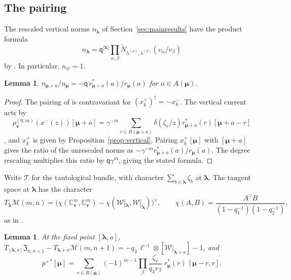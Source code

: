 \documentclass[11pt]{amsart}
\newtheorem{lemma}[theorem]{Lemma}
\theoremstyle{definition}
\theoremstyle{remark}
\newcommand{\Mq}{\mathsf q}                      %
\newcommand{\bv}{{\mathbf v}}                    %
\newcommand{\bl}{{\boldsymbol{\lambda}}}         %
\newcommand{\bmu}{{\boldsymbol{\mu}}}
\newcommand{\Add}[1]{A(#1)}                      %
\newcommand{\Rem}[1]{R(#1)}                      %
\newcommand{\bwt}[1]{\zeta_{#1}}                 %
\newcommand{\res}[2]{r_{#1}(#2)}                 %
\newcommand{\cores}[2]{r^*_{#1}(#2)}             %
\newcommand{\srcnorm}[1]{n_{#1}}                 %
\newcommand{\framing}{\mathbb C^m_{\bv}}         %
\newcommand{\Gies}[2]{\mathcal M(#1,#2)}         %
\newcommand{\Zc}{\mathfrak Z}
\newcommand{\Hecke}[1]{\Zc_{#1,#1+1}}            %
\newcommand{\Wc}{\mathcal W}                     %
\newcommand{\Tc}{\mathcal T}                     %
\newcommand{\fix}[1]{[#1]}                       %
\newcommand{\pt}[2]{[#1,#2]}                     %
\newcommand{\pplus}{p^+}                         %
\newcommand{\taut}{\ell}                         %
\newcommand{\xplus}[1]{x^+_{#1}}                 %
\newcommand{\Nek}[2]{\widetilde N_{#1,#2}}       %
\newcommand{\rhov}{\rho^{(0,m)}_{\bv}}           %
\begin{document}
\subsection{The pairing}\label{sec:form}

The rescaled vertical norms \(\srcnorm{\bl}\) of Section~\ref{sec:mainresults}
have the product formula
\begin{equation}\label{eq:sourcenormproduct}
 \srcnorm{\bl}=\Mq^{|\bl|}\prod_{\alpha,\beta}
 \Nek{\lambda^{(\alpha)}}{\lambda^{(\beta)}}(v_\alpha/v_\beta)
\end{equation}
by \cite[(2.25)]{BCS}. In particular, \(\srcnorm{\varnothing}=1\).

\begin{lemma}\label{lem:normratio}
\(\srcnorm{\bmu+a}/\srcnorm{\bmu}=-\Mq\,\cores{\bmu+a}{a}/\res{\bmu}{a}\) for
\(a\in\Add{\bmu}\).
\end{lemma}

\begin{proof}
The pairing of \cite[(2.25)]{BCS} is contravariant for \((\xplus{k})^\dagger=-x^-_k\).
The vertical current acts by
\[
 \rhov(x^-(z))\fix{\bmu+a}
 =\gamma^{-m}\sum_{r\in\Rem{\bmu+a}}
   \delta(\bwt{r}/z)\cores{\bmu+a}{r}\fix{\bmu+a-r}
\]
\cite[Section~2.2.1]{BCS}, and \(\xplus{k}\) is given by
Proposition~\ref{prop:vertical}. Pairing \(\xplus{k}\fix{\bmu}\) with
\(\fix{\bmu+a}\) gives the ratio of the unrescaled norms as
\(-\gamma^{-m}\cores{\bmu+a}{a}/\res{\bmu}{a}\).
The degree rescaling multiplies this ratio by \(\Mq\gamma^m\), giving
the stated formula.
\end{proof}

Write \(\Tc\) for the tautological bundle, with character
\(\sum_{b\in\bl}\bwt{b}\) at \(\bl\). The tangent space at \(\bl\) has the
character
\[
 T_\bl\Gies{m}{n}=\bigl(\chi(\framing,\framing)-\chi(\Wc|_\bl,\Wc|_\bl)\bigr)^\vee,
 \qquad
 \chi(A,B)=\frac{A^\vee B}{(1-q_1^{-1})(1-q_2^{-1})},
\]
as in \cite[Section~2]{N1}.

\begin{lemma}\label{lem:pplus}
At the fixed point \(\pt{\bl}{a}\),
\(T_{\pt{\bl}{a}}\Hecke{n}-T_{\bl+a}\Gies{m}{n+1}
=-q_3\,\taut^{-1}\otimes[\Wc|_{\bl+a}]-1\), and
\[
 \pplus{}^*\fix{\bmu}
 =\sum_{r\in\Rem{\bmu}}(-1)^{m-1}\prod_\beta\frac{\bwt{r}}{q_3v_\beta}\;
   \cores{\bmu}{r}\,\pt{\bmu-r}{r}.
\]
\end{lemma}
\end{document}
